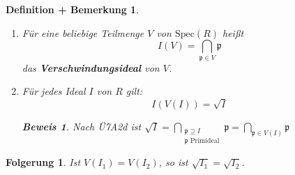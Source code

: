 \documentclass[a4paper,12pt]{scrbook}
\theoremstyle{break}
\newtheorem{DefBem}[Def]{Definition + Bemerkung}
\theoremstyle{nonumberbreak}
\newtheorem{Bew}{Beweis}
\newtheorem{nnFolg}{Folgerung}
\theoremstyle{nonumberplain}
\newcommand{\emp}[1]{\textbf{\emph{#1}}}
\begin{document}
\begin{DefBem}

\begin{enumerate}
\item[a)] Für eine beliebige Teilmenge $V$ von $\textrm{Spec}(R)$ heißt $$\displaystyle I(V) = \bigcap_{\mathfrak{p} \in V} \mathfrak{p}$$ das \emp{Verschwindungsideal} von $V$.

\item[b)] Für jedes Ideal $I$ von $R$ gilt:
$$I(V(I)) = \sqrt{I}$$

\begin{Bew}
Nach Ü7A2d ist $\displaystyle \sqrt{I} = \bigcap_{\substack{\mathfrak{p} \supseteq I \\ \mathfrak{p} \text{ Primideal}}} \mathfrak{p} = \bigcap_{\mathfrak{p} \in V(I)} \mathfrak{p}$
\end{Bew}

\end{enumerate}

\end{DefBem}

\begin{nnFolg}
Ist $V(I_1) = V(I_2)$, so ist $\sqrt{I_1} = \sqrt{I_2}$.
\end{nnFolg}
\end{document}
